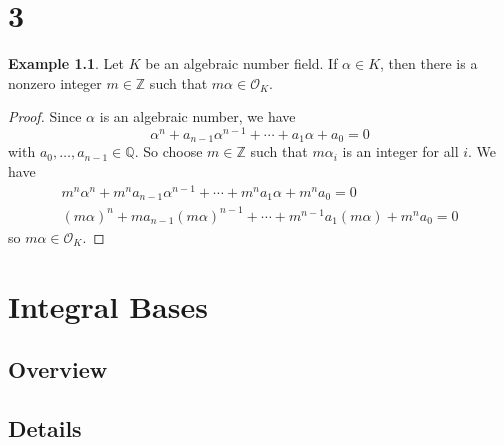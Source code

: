 \documentclass[a4paper]{book}
\theoremstyle{definition}
\newtheorem{example}{Example}[definition]
\begin{document}
\chapter{3}

\begin{example}
    Let \(K\) be an algebraic number field. If \(\alpha \in K\), then there is a nonzero integer \(m \in \mathbb{Z}\) such that \(m \alpha \in \mathcal{O}_K\).
\end{example}
\begin{proof}
    Since \(\alpha\) is an algebraic number, we have
    \begin{equation*}
        \alpha^n + a_{n-1} \alpha^{n-1} + \cdots + a_1 \alpha + a_0 = 0
    \end{equation*}
    with \(a_0, \ldots, a_{n-1} \in \mathbb{Q}\). So choose \(m \in \mathbb{Z}\) such that \(m \alpha_i\) is an integer for all \(i\). We have
    \begin{align*}
        m^n \alpha^n + m^n a_{n-1} \alpha^{n-1} + \cdots + m^n a_1 \alpha + m^n a_0 = 0 \\
        (m \alpha)^n + m a_{n-1} (m \alpha)^{n-1} + \cdots + m^{n-1} a_1 (m \alpha) + m^n a_0 = 0
    \end{align*}
    so \(m \alpha \in \mathcal{O}_K\).
\end{proof}

\chapter{Integral Bases}

\section{Overview}

\section{Details}
\end{document}
